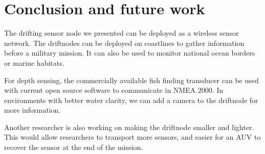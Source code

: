 \section[Conclusion]{Conclusion and future work}

The drifting sensor node we presented can be deployed as a wireless sensor network.
The driftnodes can be deployed on coastlines to gather information before a military mission.
It can also be used to monitor national ocean borders or marine habitats.

For depth sensing, the commercially available fish finding transducer can be used with current open source software to communicate in NMEA 2000.
In environments with better water clarity, we can add a camera to the driftnode for more information.

Another researcher is also working on making the driftnode smaller and lighter.
This would allow researchers to transport more sensors, and easier for an AUV to recover the sensor at the end of the mission.

